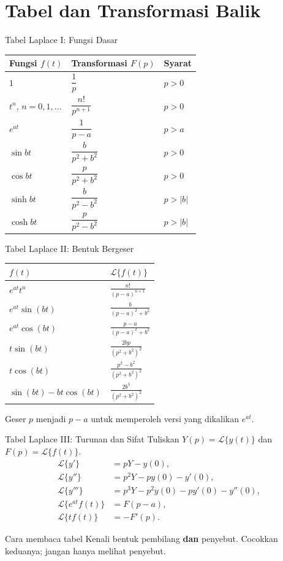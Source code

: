 \documentclass[aspectratio=169,11pt]{beamer}
\newcommand{\Lap}{\mathcal{L}}
\begin{document}
\section{Tabel dan Transformasi Balik}
\begin{frame}{Tabel Laplace I: Fungsi Dasar}
\small\centering
\begin{tabular}{p{}p{}l}
\toprule
\textbf{Fungsi $f(t)$}&\textbf{Transformasi $F(p)$}&\textbf{Syarat}\\\midrule
$1$&$\dfrac1p$&$p>0$\\[2mm]
$t^n$, $n=0,1,\ldots$&$\dfrac{n!}{p^{n+1}}$&$p>0$\\[2mm]
$e^{at}$&$\dfrac1{p-a}$&$p>a$\\[2mm]
$\sin bt$&$\dfrac{b}{p^2+b^2}$&$p>0$\\[2mm]
$\cos bt$&$\dfrac{p}{p^2+b^2}$&$p>0$\\[2mm]
$\sinh bt$&$\dfrac{b}{p^2-b^2}$&$p>|b|$\\[2mm]
$\cosh bt$&$\dfrac{p}{p^2-b^2}$&$p>|b|$\\
\bottomrule
\end{tabular}
\end{frame}

\begin{frame}{Tabel Laplace II: Bentuk Bergeser}
\small\centering
\begin{tabular}{p{}p{}}
\toprule
$f(t)$ & $\Lap\{f(t)\}$\\\midrule
$e^{at}t^n$&$\displaystyle\frac{n!}{(p-a)^{n+1}}$\\[2.5mm]
$e^{at}\sin(bt)$&$\displaystyle\frac{b}{(p-a)^2+b^2}$\\[2.5mm]
$e^{at}\cos(bt)$&$\displaystyle\frac{p-a}{(p-a)^2+b^2}$\\[2.5mm]
$t\sin(bt)$&$\displaystyle\frac{2bp}{(p^2+b^2)^2}$\\[2.5mm]
$t\cos(bt)$&$\displaystyle\frac{p^2-b^2}{(p^2+b^2)^2}$\\[2.5mm]
$\sin(bt)-bt\cos(bt)$&$\displaystyle\frac{2b^3}{(p^2+b^2)^2}$\\[2.5mm]
\bottomrule
\end{tabular}
\vspace{1mm}\scriptsize Geser $p$ menjadi $p-a$ untuk memperoleh versi yang dikalikan $e^{at}$.
\end{frame}

\begin{frame}{Tabel Laplace III: Turunan dan Sifat}
\small
Tuliskan $Y(p)=\Lap\{y(t)\}$ dan $F(p)=\Lap\{f(t)\}$.
\[
\begin{aligned}
\Lap\{y'\}&=pY-y(0),\\
\Lap\{y''\}&=p^2Y-py(0)-y'(0),\\
\Lap\{y'''\}&=p^3Y-p^2y(0)-py'(0)-y''(0),\\
\Lap\{e^{at}f(t)\}&=F(p-a),\\
\Lap\{t f(t)\}&=-F'(p).
\end{aligned}
\]
\begin{block}{Cara membaca tabel}
Kenali bentuk pembilang \textbf{dan} penyebut. Cocokkan keduanya; jangan hanya melihat penyebut.
\end{block}
\end{frame}
\end{document}
